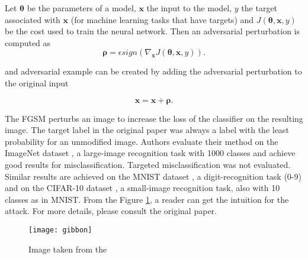 Let $\pmb \theta$ be the parameters of a model, $\pmb x$ the input to the model, $y$ the target associated with $\pmb x$ (for machine learning tasks that have targets) and $J (\pmb \theta, \pmb x, y)$ be the cost used to train the neural network. Then an adversarial perturbation is computed as 
\[ \pmb \rho = \epsilon sign (\nabla_{\pmb x} J(\pmb \theta, \pmb x, y)). \]

and adversarial example can be created by adding the adversarial perturbation to the original input

 \[\pmb x = \pmb x + \pmb \rho .\]
 
 
The FGSM perturbs an image to increase the loss of the classifier on the resulting image. The target label in the original paper \cite{fgsm-original} was always a label with the least probability for an unmodified image. Authors evaluate their method on the ImageNet dataset \cite{datasetImageNet}, a large-image recognition task with 1000 classes and achieve good results for misclassification. Targeted misclassification was not evaluated. Similar results are achieved on the MNIST dataset 	\cite{datasetMNIST}, a digit-recognition task (0-9) and on the CIFAR-10 dataset \cite{datasetCIFAR10}, a small-image recognition task, also with 10 classes as in MNIST. From the Figure \ref{fig:gibbon}, a reader can get the intuition for the attack. For more details, please consult the original paper.

\begin{figure}[h]
\texttt{[image: gibbon]}
\caption{Image taken from the \cite{fgsm-original}}
\label{fig:gibbon}
\end{figure}

